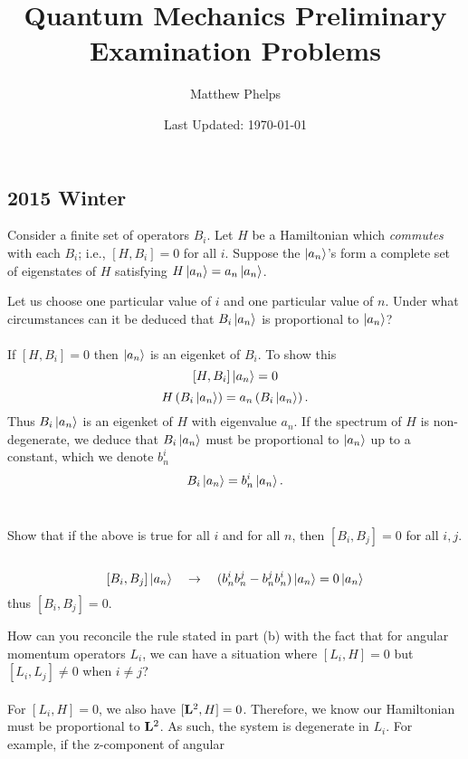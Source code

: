 \documentclass[11pt,letterpaper]{article}
\title{Quantum Mechanics Preliminary Examination Problems}
\author{Matthew Phelps}
\date{Last Updated: \today}
\begin{document}
\maketitle

\subsection*{2015 Winter}
\phantom{}
	\benum
		\item
		Consider a finite set of operators $B_i$. Let $H$ be a Hamiltonian which \emph{commutes} with each $B_i$; i.e., $[H,B_i]=0$ for all $i		$. Suppose the $\ket{a_n}$'s form a complete set of eigenstates of $H$ satisfying $H\ket{a_n} = a_n\ket{a_n}$.
		\benum
			\item
			Let us choose one particular value of $i$ and one particular value of $n$. Under what circumstances can it be deduced that $B_i			\ket{a_n}$ is proportional to $\ket{a_n}$?
			\\
			\\
			If $[H,B_i]=0$ then $\ket{a_n}$ is an eigenket of $B_i$. To show this
			\[
				[H,B_i]\ket{a_n} = 0
			\]
			\[
				H\left(B_i\ket{a_n}\right) = a_n\left(B_i\ket{a_n}\right).
			\]
			Thus $B_i\ket{a_n}$ is an eigenket of $H$ with eigenvalue $a_n$. If the spectrum of $H$ is non-degenerate, we 
			deduce that $B_i\ket{a_n}$ must be proportional to $\ket{a_n}$ up to a constant, which we denote $b^i_n$
			\[
				B_i\ket{a_n} = b^i_n\ket{a_n}.
			\]
			\\
			\item
			Show that if the above is true for all $i$ and for all $n$, then $[B_i,B_j]=0$ for all $i,j$. 
			\\
			\\
			\[
				[B_i,B_j]\ket{a_n}\quad\to\quad (b^i_nb^j_n-b^j_nb^i_n)\ket{a_n} = 0\ket{a_n}
			\]
			thus $[B_i,B_j] = 0$. 
			\\
			\item
			How can you reconcile the rule stated in part (b) with the fact that for angular momentum operators $L_i$, we can have a 
			situation where $[L_i,H] = 0$ but $[L_i,L_j] \ne 0$ when $i\ne j$?
			\\
			\\
			For $[L_i,H] = 0$, we also have $[\mathbf{L}^2,H] = 0$. Therefore, we know our Hamiltonian must be
			proportional to $\mathbf{L}^2$. As such, the system is degenerate in $L_i$. For example, if the z-component of angular
\end{document}
